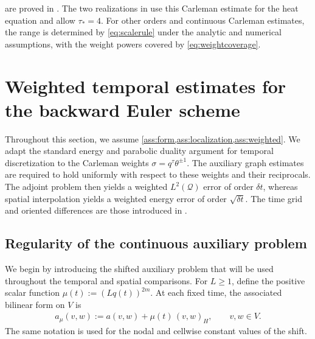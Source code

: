 \documentclass[print,wide,eng]{draft}
\begin{document}
 are proved in . The two realizations in  use this Carleman estimate for the heat equation and allow $\tau_*=4$. For other orders and continuous Carleman estimates, the range is determined by \cref{eq:scalerule} under the analytic and numerical assumptions, with the weight powers covered by \cref{eq:weightcoverage}.




\section{Weighted temporal estimates for the backward Euler scheme}\label{sec:time}

Throughout this section, we assume \cref{ass:form,ass:localization,ass:weighted}. We adapt the standard energy and parabolic duality argument for temporal discretization to the Carleman weights $\sigma=q^\tau\theta^{\pm1}$. The auxiliary graph estimates are required to hold uniformly with respect to these weights and their reciprocals. The adjoint problem then yields a weighted $L^2(\mathcal Q)$ error of order $\delta t$, whereas spatial interpolation yields a weighted energy error of order $\sqrt{\delta t}$. The time grid and oriented differences are those introduced in .


\subsection{Regularity of the continuous auxiliary problem}

We begin by introducing the shifted auxiliary problem that will be used throughout the temporal and spatial comparisons. For $L\geq1$, define the positive scalar function $\mu(t):=(Lq(t))^{2m}$. At each fixed time, the associated bilinear form on $V$ is
%
\begin{align}
a_\mu(v,w):=a(v,w)+\mu(t)\,(v,w)_H,\qquad v,w\in V.\label{eq:shiftedform}
\end{align}
%
The same notation is used for the nodal and cellwise constant values of the shift.
\end{document}

